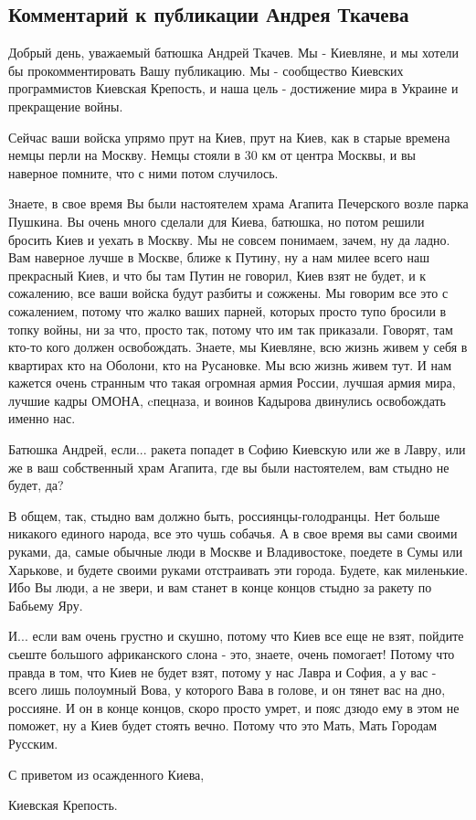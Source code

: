 
 
 
 
 

\subsection{Комментарий к публикации Андрея Ткачева}

Добрый день, уважаемый батюшка Андрей Ткачев. Мы - Киевляне, и мы хотели бы
прокомментировать Вашу публикацию.  Мы - сообщество Киевских программистов
Киевская Крепость, и наша цель - достижение мира в Украине и прекращение войны.

Сейчас ваши войска упрямо прут на Киев, прут на Киев, как в старые времена
немцы перли на Москву. Немцы стояли в 30 км от центра Москвы, и вы наверное
помните, что с ними потом случилось. 

Знаете, в свое время Вы были настоятелем храма Агапита Печерского возле парка
Пушкина. Вы очень много сделали для Киева, батюшка, но потом решили бросить
Киев и уехать в Москву.  Мы не совсем понимаем, зачем, ну да ладно. Вам
наверное лучше в Москве, ближе к Путину, ну а нам милее всего наш прекрасный
Киев, и что бы там Путин не говорил, Киев взят не будет, и к сожалению, все
ваши войска будут разбиты и сожжены. Мы говорим все это с сожалением, потому
что жалко ваших парней, которых просто тупо бросили в топку войны, ни за что,
просто так, потому что им так приказали. Говорят, там кто-то кого должен
освобождать. Знаете, мы Киевляне, всю жизнь живем у себя в квартирах кто на
Оболони, кто на Русановке. Мы всю жизнь живем тут. И нам кажется очень странным
что такая огромная армия России, лучшая армия мира, лучшие кадры ОМОНА,
cпецназа, и воинов Кадырова двинулись освобождать именно нас.

Батюшка Андрей, если... ракета попадет в Софию Киевскую или же в Лавру, или же
в ваш собственный храм Агапита, где вы были настоятелем, вам стыдно не будет,
да?

В общем, так, стыдно вам должно быть, россиянцы-голодранцы. Нет больше никакого
единого народа, все это чушь собачья. А в свое время вы сами своими руками, да,
самые обычные люди в Москве и Владивостоке, поедете в Сумы или Харькове, и
будете своими руками отстраивать эти города. Будете, как миленькие.  Ибо Вы
люди, а не звери,  и вам станет в конце концов стыдно за ракету по Бабьему Яру.

И... если вам очень грустно и скушно, потому что Киев все еще не взят, пойдите
сьеште большого африканского слона - это, знаете, очень помогает! Потому что
правда в том, что Киев не будет взят, потому у нас Лавра и София, а у вас -
всего лишь полоумный Вова,  у которого Вава в голове,  и он тянет вас на дно,
россияне. И он в конце концов, скоро просто умрет, и пояс дзюдо ему в этом не
поможет, ну а Киев будет стоять вечно. Потому что это Мать, Мать Городам
Русским.

С приветом из осажденного Киева,

Киевская Крепость.

